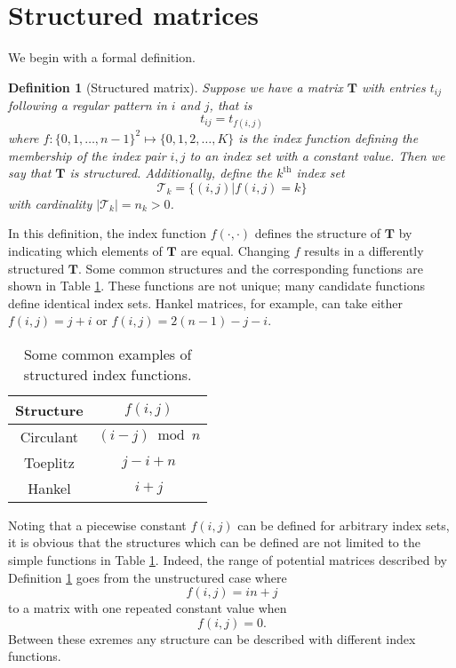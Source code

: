 \documentclass[letterpaper,12pt,oneside,final]{article}
\newtheorem{definition}{Definition}
\newcommand{\m}[1]{\mathbf{#1}}               %
\begin{document}
\section{Structured matrices} \label{sec:struc}

We begin with a formal definition.

\begin{definition}[Structured matrix] \label{def:strucMat}
  Suppose we have a matrix $\m{T}$ with entries $t_{ij}$ following a regular pattern in $i$ and $j$, that is
  \begin{equation} \label{eq:generalStruc}
    t_{ij} = t_{f(i,j)}
  \end{equation}
  where $f:\{0,1, \dots, n-1\}^2 \mapsto \{0, 1, 2, \dots, K\}$ is the index function defining the membership of the index pair $i,j$ to an index set with a constant value. Then we say that $\m{T}$ is \emph{structured}. Additionally, define the $k^{\text{th}}$ index set
  $$\mathcal{T}_k = \{(i,j) | f(i,j) = k\}$$
  with cardinality $\lvert \mathcal{T}_k \rvert = n_k > 0$.
\end{definition}

In this definition, the index function $f(\cdot,\cdot)$ defines the structure of $\m{T}$ by indicating which elements of $\m{T}$ are equal. Changing $f$ results in a differently structured $\m{T}$. Some common structures and the corresponding functions are shown in Table \ref{tab:indexfuns}. These functions are not unique; many candidate functions define identical index sets. Hankel matrices, for example, can take either $f(i,j) = j + i$ or $f(i,j) = 2(n-1) - j - i$.

\begin{table}
  \begin{center}
  \begin{tabular} {|c|c|} \hline
    Structure & $f(i,j)$ \\ \hline
    Circulant & $(i - j) \bmod n$ \\
    Toeplitz & $j - i + n$ \\
    Hankel & $i + j$ \\ \hline
  \end{tabular}
  \caption{Some common examples of structured index functions.} \label{tab:indexfuns}
  \end{center}
\end{table}

Noting that a piecewise constant $f(i,j)$ can be defined for arbitrary index sets, it is obvious that the structures which can be defined are not limited to the simple functions in Table \ref{tab:indexfuns}. Indeed, the range of potential matrices described by Definition \ref{def:strucMat} goes from the unstructured case where
$$f(i,j) = in + j$$
to a matrix with one repeated constant value when
$$f(i,j) = 0.$$
Between these exremes any structure can be described with different index functions.
\end{document}

